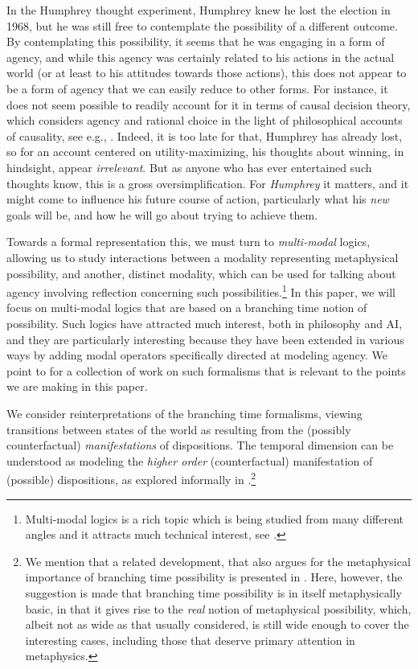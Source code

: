 \documentclass{article}
\begin{document}
In the Humphrey thought experiment, Humphrey knew he lost the election in 1968, but he was still free to contemplate the possibility of a different outcome. By contemplating this possibility, it seems that he was engaging in a form of agency, and while this agency was certainly related to his actions in the actual world (or at least to his attitudes towards those actions), this does not appear to be a form of agency that we can easily reduce to other forms. For instance, it does not seem possible to readily account for it in terms of causal decision theory, which considers agency and rational choice in the light of philosophical accounts of causality, see e.g., \cite{joyce}. Indeed, it is too late for that, Humphrey has already lost, so for an account centered on utility-maximizing, his thoughts about winning, in hindsight, appear \emph{irrelevant}. But as anyone who has ever entertained such thoughts know, this is a gross oversimplification. For \emph{Humphrey} it matters, and it might come to influence his future course of action, particularly what his \emph{new} goals will be, and how he will go about trying to achieve them.

Towards a formal representation this, we must turn to \emph{multi-modal} logics, allowing us to study interactions between a modality representing metaphysical possibility, and another, distinct modality, which can be used for talking about agency involving reflection concerning such possibilities.\footnote{Multi-modal logics is a rich topic which is being studied from many different angles and it attracts much technical interest, see \cite{multimod}.} In this paper, we will focus on multi-modal logics that are based on a branching time notion of possibility. Such logics have attracted much interest, both in philosophy and AI, and they are particularly interesting because they have been extended in various ways by adding modal operators specifically directed at modeling agency. We point to \cite{stit,dstit,atl,atle,nctl,stitstart} for a collection of work on such formalisms that is relevant to the points we are making in this paper.

We consider reinterpretations of the branching time formalisms, viewing transitions between states of the world as resulting from the (possibly counterfactual) \emph{manifestations} of dispositions. The temporal dimension can be understood as modeling the \emph{higher order} (counterfactual) manifestation of (possible) dispositions, as explored informally in \cite{dispmod}.\footnote{We mention that a related development, that also argues for the metaphysical importance of branching time possibility is presented in \cite{realmod}. Here, however, the suggestion is made that branching time possibility is in itself metaphysically basic, in that it gives rise to the \emph{real} notion of metaphysical possibility, which, albeit not as wide as that usually considered, is still wide enough to cover the interesting cases, including those that deserve primary attention in metaphysics.}
\end{document}
